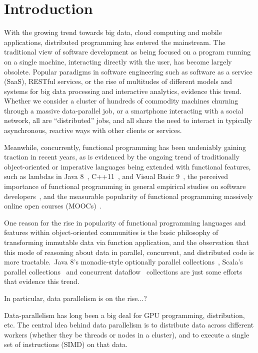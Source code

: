 \documentclass{llncs}
\begin{document}
\section{Introduction}

With the growing trend towards big data, cloud computing and mobile
applications, distributed programming has entered the mainstream. The
traditional view of software development as being focused on a program running
on a single machine, interacting directly with the user, has become largely
obsolete. Popular paradigms in software engineering such as software as a
service (SaaS), RESTful services, or the rise of multitudes of different
models and systems for big data processing and interactive analytics, evidence
this trend. Whether we consider a cluster of hundreds of commodity machines
churning through a massive data-parallel job, or a smartphone interacting with
a social network, all are ``distributed'' jobs, and all share the need to
interact in typically asynchronous, reactive ways with other clients or
services.

Meanwhile, concurrently, functional programming has been undeniably gaining
traction in recent years, as is evidenced by the ongoing trend of
traditionally object-oriented or imperative languages being extended with
functional features, such as lambdas in {Java 8}~\cite{JavaLambdas},
C++11~\cite{CplusplusLambas}, and Visual Basic 9~\cite{Meijer}, the perceived
importance of functional programming in general empirical studies on software
developers~\cite{PLAdoption}, and the measurable popularity of functional
programming massively online open courses (MOOCs)~\cite{ICSEMOOC}.

One reason for the rise in popularity of functional programming languages and
features within object-oriented communities is the basic philosophy of
transforming immutable data via function application, and the observation that
this mode of reasoning about data in parallel, concurrent, and distributed
code is more tractable.~{Java 8}'s monadic-style optionally parallel
collections~\cite{JavaLambdas}, Scala's parallel
collections~\cite{ScalaParColls} and concurrent dataflow~\cite{FlowPools}
collections are just some efforts that evidence this trend.

In particular, data parallelism is on the rise...?

Data-parallelism has long been a big deal for GPU programming, distribution,
etc.  The central idea behind data parallelism is to distribute data across
different workers (whether they be threads or nodes in a cluster), and to
execute a single set of instructions (SIMD) on that data.
\end{document}
